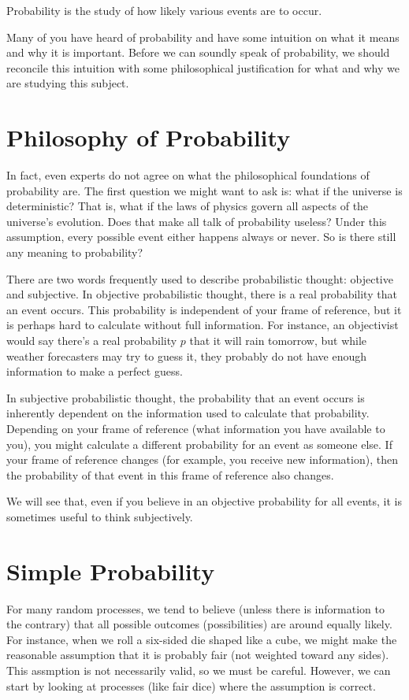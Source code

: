 \documentclass[a4paper,10pt]{report}
\begin{document}
Probability is the study of how likely various events are to occur.

Many of you have heard of probability and have some intuition on what it means and why it is
important. Before we can soundly speak of probability, we should reconcile this intuition
with some philosophical justification for what and why we are studying this subject.

\section{Philosophy of Probability}

In fact, even experts do not agree on what the philosophical foundations of probability are.
The first question we might want to ask is: what if the universe is deterministic? That is,
what if the laws of physics govern all aspects of the universe's evolution. Does that make
all talk of probability useless? Under this assumption, every possible event either happens
always or never. So is there still any meaning to probability?

There are two words frequently used to describe probabilistic thought: objective and
subjective. In objective probabilistic thought, there is a real probability that an event
occurs. This probability is independent of your frame of reference, but it is perhaps hard
to calculate without full information. For instance, an objectivist would say there's a real
probability \(p\) that it will rain tomorrow, but while weather forecasters may try to guess
it, they probably do not have enough information to make a perfect guess.

In subjective probabilistic thought, the probability that an event occurs is inherently
dependent on the information used to calculate that probability. Depending on your frame of
reference (what information you have available to you), you might calculate a different
probability for an event as someone else. If your frame of reference changes (for example,
you receive new information), then the probability of that event in this frame of reference
also changes.

We will see that, even if you believe in an objective probability for all events, it is
sometimes useful to think subjectively.

\section{Simple Probability}

For many random processes, we tend to believe (unless there is information to the contrary)
that all possible outcomes (possibilities) are around equally likely. For instance, when we
roll a six-sided die shaped like a cube, we might make the reasonable assumption that it is
probably fair (not weighted toward any sides). This assmption is not necessarily valid, so
we must be careful. However, we can start by looking at processes (like fair dice) where the
assumption is correct.
\end{document}
